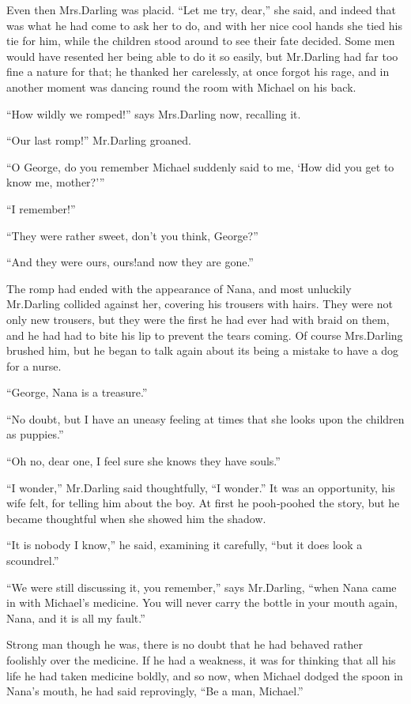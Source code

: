 Even then Mrs.\@ Darling was placid.
“Let me try, dear,” she said,
and indeed that was what he had come to ask her to do,
and with her nice cool hands she tied his tie for him,
while the children stood around to see their fate decided.
Some men would have resented her being able to do it so easily,
but Mr.\@ Darling had far too fine a nature for that;
he thanked her carelessly, at once forgot his rage,
and in another moment was dancing round the room with Michael on his back.

“How wildly we romped!\@” says Mrs.\@ Darling now, recalling it.

“Our last romp!\@” Mr.\@ Darling groaned.

“O George, do you remember Michael suddenly said to me,
‘How did you get to know me, mother?’”

“I remember!”

“They were rather sweet, don’t you think, George?”

“And they were ours, ours!\@ and now they are gone.”

The romp had ended with the appearance of Nana,
and most unluckily Mr.\@ Darling collided against her,
covering his trousers with hairs.
They were not only new trousers,
but they were the first he had ever had with braid on them,
and he had had to bite his lip to prevent the tears coming.
Of course Mrs.\@ Darling brushed him,
but he began to talk again about its being a mistake to have a dog for a nurse.

“George, Nana is a treasure.”

“No doubt, but I have an uneasy feeling at times that she looks upon the children as puppies.”

“Oh no, dear one, I feel sure she knows they have souls.”

“I wonder,” Mr.\@ Darling said thoughtfully, “I wonder.”
It was an opportunity, his wife felt, for telling him about the boy.
At first he pooh‐poohed the story, but he became thoughtful when she showed him the shadow.

“It is nobody I know,” he said, examining it carefully, “but it does look a scoundrel.”

“We were still discussing it, you remember,” says Mr.\@ Darling, “when Nana came in with Michael’s medicine.
You will never carry the bottle in your mouth again, Nana, and it is all my fault.”

Strong man though he was, there is no doubt that he had behaved rather foolishly over the medicine.
If he had a weakness, it was for thinking that all his life he had taken medicine boldly,
and so now, when Michael dodged the spoon in Nana’s mouth, he had said reprovingly, “Be a man, Michael.”

